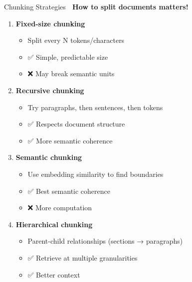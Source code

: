 \documentclass[aspectratio=169]{beamer}
\begin{document}
\begin{frame}[shrink=10]{Chunking Strategies 📄}
\textbf{How to split documents matters!}

\vspace{0.5em}

\begin{enumerate}\setlength{\itemsep}{0pt}
    \item \textbf{Fixed-size chunking}
    \begin{itemize}\setlength{\itemsep}{0pt}
        \item Split every N tokens/characters
        \item ✅ Simple, predictable size
        \item ❌ May break semantic units
    \end{itemize}

    \item \textbf{Recursive chunking}
    \begin{itemize}\setlength{\itemsep}{0pt}
        \item Try paragraphs, then sentences, then tokens
        \item ✅ Respects document structure
        \item ✅ More semantic coherence
    \end{itemize}

    \item \textbf{Semantic chunking}
    \begin{itemize}\setlength{\itemsep}{0pt}
        \item Use embedding similarity to find boundaries
        \item ✅ Best semantic coherence
        \item ❌ More computation
    \end{itemize}

    \item \textbf{Hierarchical chunking}
    \begin{itemize}\setlength{\itemsep}{0pt}
        \item Parent-child relationships (sections → paragraphs)
        \item ✅ Retrieve at multiple granularities
        \item ✅ Better context
    \end{itemize}
\end{enumerate}
\end{frame}
\end{document}
